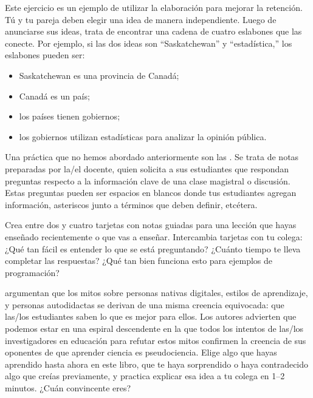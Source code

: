 
Este ejercicio es un ejemplo de utilizar la elaboración para mejorar la retención.
Tú y tu pareja deben elegir una idea de manera independiente.
Luego de anunciarse sus ideas,
trata de encontrar una cadena de cuatro eslabones
que las conecte.
Por ejemplo,
si las dos ideas son ``Saskatchewan'' y ``estadística,''
los eslabones pueden ser:

\begin{itemize}

\item
  Saskatchewan es una provincia de Canadá;

\item
  Canadá es un país;

\item
 los países tienen gobiernos;

\item
  los gobiernos utilizan estadísticas para analizar la opinión pública.

\end{itemize}


Una práctica que no hemos abordado anteriormente son las .
Se trata de notas preparadas por la/el docente,
quien solicita a sus estudiantes que respondan preguntas respecto a la información clave de una clase magistral o discusión.
Estas preguntas pueden ser espacios en blancos donde tus estudiantes agregan información,
asteriscos junto a términos que deben definir,
etcétera.

Crea entre dos y cuatro tarjetas con notas guiadas para una lección que hayas enseñado recientemente
o que vas a enseñar.
Intercambia tarjetas con tu colega:
¿Qué tan fácil es entender lo que se está preguntando?
¿Cuánto tiempo te lleva completar las respuestas?
¿Qué tan bien funciona esto para ejemplos de programación?


\cite{Kirs2013} argumentan que los mitos sobre personas nativas digitales,
estilos de aprendizaje,
y personas autodidactas se derivan de una misma creencia equivocada: que
las/los estudiantes saben lo que es mejor para ellos.
Los autores advierten que podemos estar en una espiral descendente
en la que todos los intentos de las/los investigadores en educación para refutar estos mitos
confirmen la creencia de sus oponentes de que aprender ciencia es pseudociencia.
Elige algo que hayas aprendido hasta ahora en este libro,
que te haya sorprendido o haya contradecido algo que creías previamente,
y practica explicar esa idea a tu colega en 1--2 minutos.
¿Cuán convincente eres?

